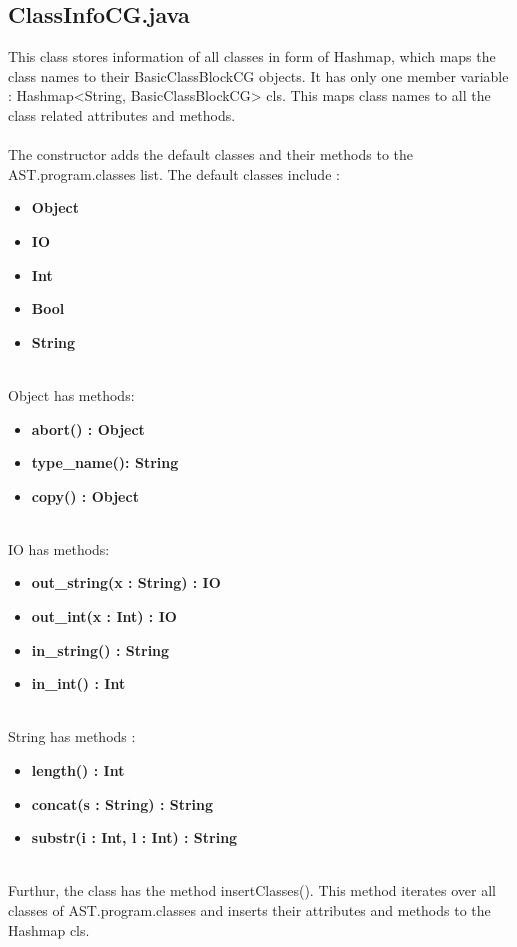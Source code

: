 \documentclass{article}
\begin{document}
\subsection{ClassInfoCG.java}
This class stores information of all classes in form of Hashmap, which maps the class names to their BasicClassBlockCG objects. It has only one member variable : Hashmap<String, BasicClassBlockCG> cls. This maps class names to all the class related attributes and methods. \\
\\
The constructor adds the default classes and their methods to the AST.program.classes list. The default classes include :
\begin{itemize}

    \item \textbf{Object}
    \item \textbf{IO}
    \item \textbf{Int}
    \item \textbf{Bool}
    \item \textbf{String}

\end{itemize}
\\
Object has methods:
\begin{itemize}

    \item \textbf{abort() : Object}
    \item \textbf{type\_name(): String}
    \item \textbf{copy() : Object}

\end{itemize}
\\
IO has methods:
\begin{itemize}

    \item \textbf{out\_string(x : String) : IO}
    \item \textbf{out\_int(x : Int) : IO}
    \item \textbf{in\_string() : String}
    \item \textbf{in\_int() : Int}

\end{itemize}
\\
String has methods :
\begin{itemize}

    \item \textbf{length() : Int}
    \item \textbf{concat(s : String) : String}
    \item \textbf{substr(i : Int, l : Int) : String}

\end{itemize} \\
Furthur, the class has the method insertClasses(). This method iterates over all classes of AST.program.classes and inserts their attributes and methods to the Hashmap cls.
\end{document}
